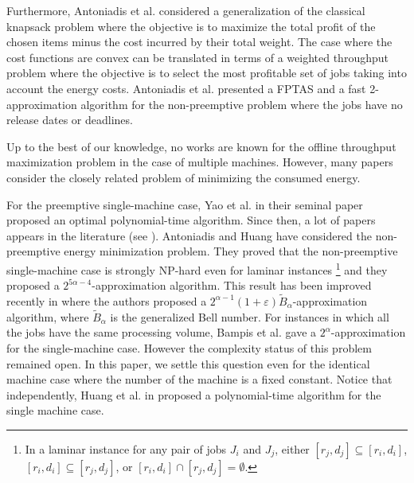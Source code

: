 \documentclass[11pt,a4paper]{article}
\begin{document}
Furthermore, Antoniadis et al. \cite{AHOV13} considered a generalization of the classical knapsack problem where the objective is to maximize the total profit of the chosen items minus the cost incurred by their total weight. The case where the cost functions are convex can be translated in terms of a weighted throughput problem where the objective is to select the most profitable set of jobs taking into account the energy costs. Antoniadis et al. presented a FPTAS and a fast 2-approximation algorithm for the non-preemptive problem where the jobs have no release dates or deadlines.

Up to the best of our knowledge, no works are known for the offline throughput maximization problem in the case of multiple machines. However, many papers consider the closely related problem of minimizing the consumed energy.

For the preemptive single-machine case, Yao et al.\cite{YDS95} in their seminal paper proposed an optimal polynomial-time algorithm. Since then, a lot of papers appears in the literature (see \cite{Albers10}).
Antoniadis and Huang \cite{AH13} have considered the non-preemptive energy minimization problem. They proved that the non-preemptive single-machine case
is strongly NP-hard even for laminar instances \footnote{In a laminar instance  for any
pair of jobs $J_i$ and $J_j$, either $[r_j,d_j]\subseteq[r_i,d_i]$, 
$[r_i,d_i]\subseteq[r_j,d_j]$, or $[r_i,d_i]\cap [r_j,d_j]=\emptyset$.} and they proposed a 
$2^{5\alpha -4}$-approximation algorithm. This result has been improved recently in \cite{DBLP:conf/fsttcs/BKLLS13} where the authors proposed a $2^{\alpha-1}(1+\varepsilon)\tilde{B}_{\alpha}$-approximation algorithm, where $\tilde{B}_{\alpha}$ is the generalized Bell number.
For instances in which all the jobs have the same processing volume,
Bampis et al. \cite{BKLLN13} gave a $2^{\alpha}$-approximation for the single-machine case.
However the complexity status of this problem remained open.
In this paper, we settle this question even for the identical machine case where the number of the machine is a fixed constant. Notice that independently, Huang et al. in \cite{HO13} proposed a polynomial-time algorithm for the single machine case.
\end{document}
